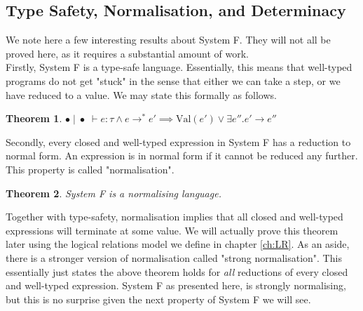 \documentclass[a4paper, 11pt]{report}
\newtheorem{theorem}{Theorem}
\theoremstyle{definition}
\newcommand{\expr}{e}
\newcommand{\typ}{\tau}
\newcommand{\emptenv}{\bullet}
\newcommand{\empvenv}{\bullet}
\newcommand{\jdg}[4]{#1 \; | \; #2 \; \vdash #3 : #4}
\newcommand{\step}{\rightarrow}
\newcommand{\stepS}{\rightarrow^*}
\newcommand{\Val}[1]{\mathrm{Val}(#1)}
\begin{document}
\subsection{Type Safety, Normalisation, and Determinacy}
We note here a few interesting results about System F. They will not all be proved here, as it requires a substantial amount of work.\\
Firstly, System F is a type-safe language. Essentially, this means that well-typed programs do not get "stuck" in the sense that either we can take a step, or we have reduced to a value. We may state this formally as follows.
\begin{theorem}\label{thm:typesafety}
  $\jdg{\emptenv}{\empvenv}{\expr}{\typ} \land \expr \stepS \expr' \implies \Val{\expr'} \lor \exists \expr'' . \expr' \step \expr''$
\end{theorem}
Secondly, every closed and well-typed expression in System F has a reduction to normal form. An expression is in normal form if it cannot be reduced any further. This property is called "normalisation".
\begin{theorem}\label{thm:norm}
  System F is a normalising language.
\end{theorem}
Together with type-safety, normalisation implies that all closed and well-typed expressions will terminate at some value. We will actually prove this theorem later using the logical relations model we define in chapter \ref{ch:LR}. As an aside, there is a stronger version of normalisation called "strong normalisation". This essentially just states the above theorem holds for \textit{all} reductions of every closed and well-typed expression. System F as presented here, is strongly normalising, but this is no surprise given the next property of System F we will see.
\end{document}
